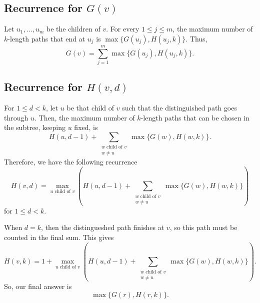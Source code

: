 \documentclass[11pt]{scrartcl}
\theoremstyle{plain}
\theoremstyle{definition}
\theoremstyle{remark}
\begin{document}
\subsection{Recurrence for $G(v)$}
Let $u_1, \ldots, u_m$ be the children of $v$. For every $1\leq j\leq m$, the maximum number of $k$-length paths that end at $u_j$ is $\max\{G(u_j), H(u_j, k)\}$. Thus, \[G(v) = \sum_{j=1}^m \max\{G(u_j), H(u_j, k)\}.\]

\subsection{Recurrence for $H(v, d)$}
For $1\leq d < k$, let $u$ be that child of $v$ such that the distinguished path goes through $u$. Then, the maximum number of $k$-length paths that can be chosen in the subtree, keeping $u$ fixed, is \[H(u, d-1) + \sum_{\substack{w \text{ child of } v\\ w\neq u}}\max\{G(w), H(w, k)\}.\]Therefore, we have the following recurrence \[H(v, d) = \max_{u \text{ child of } v} \left(H(u, d-1) + \sum_{\substack{w \text{ child of } v\\ w\neq u}}\max\{G(w), H(w, k)\}\right)\] for $1\leq d < k$.

When $d = k$, then the distingueshed path finishes at $v$, so this path must be counted in the final sum. This gives \[H(v, k) = 1 + \max_{u \text{ child of } v}\left(H(u, d-1) + \sum_{\substack{w \text{ child of } v\\ w\neq u}}\max\{G(w), H(w, k)\}\right).\]So, our final answer is $$\max\{G(r), H(r, k)\}.$$
\end{document}
